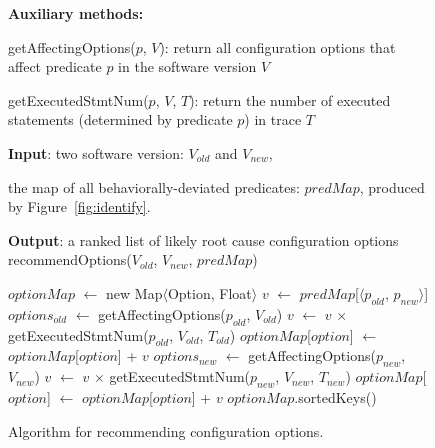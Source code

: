 
\begin{figure}[t]
\textbf{Auxiliary methods:}

\quad getAffectingOptions($\mathit{p}$, $\mathit{V}$): return all configuration options that affect predicate $\mathit{p}$ in the software version $\mathit{V}$

\quad getExecutedStmtNum($\mathit{p}$, $\mathit{V}$, $\mathit{T}$): return the number of executed statements (determined by predicate $\mathit{p}$) in trace $\mathit{T}$

\textbf{Input}: two software version: $\mathit{V_{old}}$ and $\mathit{V_{new}}$, 

\quad the map of all behaviorally-deviated predicates: $\mathit{predMap}$, produced by Figure~\ref{fig:identify}.

\textbf{Output}: {a ranked list of likely root cause configuration options}
\vspace{-4mm}%
recommendOptions($\mathit{V_{old}}$, $\mathit{V_{new}}$, $\mathit{predMap}$)\\
\begin{algorithmic}[1]
\STATE $\mathit{optionMap}$ $\leftarrow$ new Map$\langle$Option, Float$\rangle$
\STATE $\mathit{v}$ $\leftarrow$ $\mathit{predMap}$[$\langle$$\mathit{p_{old}}$, $\mathit{p_{new}}$$\rangle$]
\STATE $\mathit{options_{old}}$ $\leftarrow$ getAffectingOptions($\mathit{p_{old}}$, $\mathit{V_{old}}$)
\STATE $\mathit{v}$ $\leftarrow$ $\mathit{v}$ $\times$ getExecutedStmtNum($\mathit{p_{old}}$, $\mathit{V_{old}}$, $\mathit{T_{old}}$)
\STATE $\mathit{optionMap}$[$\mathit{option}$] $\leftarrow$ $\mathit{optionMap}$[$\mathit{option}$] + $\mathit{v}$
\ENDFOR
\ENDIF
{}
\STATE $\mathit{options_{new}}$ $\leftarrow$ getAffectingOptions($\mathit{p_{new}}$, $\mathit{V_{new}}$)
\STATE $\mathit{v}$ $\leftarrow$ $\mathit{v}$ $\times$ getExecutedStmtNum($\mathit{p_{new}}$, $\mathit{V_{new}}$, $\mathit{T_{new}}$)
\STATE $\mathit{optionMap}$[$\mathit{option}$] $\leftarrow$ $\mathit{optionMap}$[$\mathit{option}$] + $\mathit{v}$
\ENDFOR
\ENDIF
\ENDFOR
\RETURN $\mathit{optionMap}$.sortedKeys()
\vspace{-2mm}
\end{algorithmic}
\caption{Algorithm for recommending configuration options.
\label{fig:recommend}
}
\end{figure}
